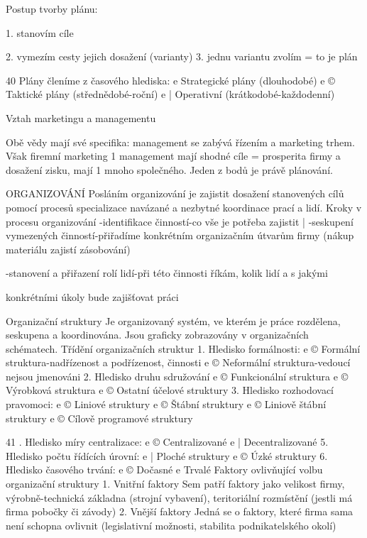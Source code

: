 Postup tvorby plánu:

1. stanovím cíle

2. vymezím cesty jejich dosažení (varianty)
3. jednu variantu zvolím = to je plán

40
\newpage
Plány členíme z časového hlediska:
e Strategické plány (dlouhodobé)
e © Taktické plány (střednědobé-roční)
e | Operativní (krátkodobé-každodenní)

Vztah marketingu a managementu

Obě vědy mají své specifika: management se zabývá řízením a marketing trhem. Však firemní
marketing 1 management mají shodné cíle = prosperita firmy a dosažení zisku, mají 1 mnoho
společného. Jeden z bodů je právě plánování.

ORGANIZOVÁNÍ
Posláním organizování je zajistit dosažení stanovených cílů pomocí procesů specializace
navázané a nezbytné koordinace prací a lidí.
Kroky v procesu organizování
-identifikace činností-co vše je potřeba zajistit |
-seskupení vymezených činností-přiřadíme konkrétním organizačním útvarům
firmy (nákup materiálu zajistí zásobování)

-stanovení a přiřazení rolí lidí-při této činnosti říkám, kolik lidí a s jakými

konkrétními úkoly bude zajišťovat práci

Organizační struktury
Je organizovaný systém, ve kterém je práce rozdělena, seskupena a koordinována. Jsou
graficky zobrazovány v organizačních schématech.
Třídění organizačních struktur
1. Hledisko formálnosti:
e © Formální struktura-nadřízenost a podřízenost, činnosti
e © Neformální struktura-vedoucí nejsou jmenováni
2. Hledisko druhu sdružování
e © Funkcionální struktura
e © Výrobková struktura
e © Ostatní účelové struktury
3. Hledisko rozhodovací pravomoci:
e © Liniové struktury
e © Štábní struktury
e © Liniově štábní struktury
e © Cílově programové struktury

41
. Hledisko míry centralizace:
e © Centralizované
e | Decentralizované
5. Hledisko počtu řídících úrovní:
e | Ploché struktury
e © Úzké struktury
6. Hledisko časového trvání:
e © Dočasné
e Trvalé
Faktory ovlivňující volbu organizační struktury
1. Vnitřní faktory
Sem patří faktory jako velikost firmy, výrobně-technická základna (strojní vybavení),
teritoriální rozmístění (jestli má firma pobočky či závody)
2. Vnější faktory
Jedná se o faktory, které firma sama není schopna ovlivnit (legislativní možnosti, stabilita
podnikatelského okolí)






